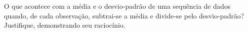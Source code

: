 %
%


\begin{exercicioBanco}[\valorquestao]
O que acontece com a média e o desvio-padrão de uma sequência de dados quando, de cada observação, subtrai-se a média e divide-se pelo desvio-padrão? Justifique, demonstrando seu raciocínio.
\end{exercicioBanco}

